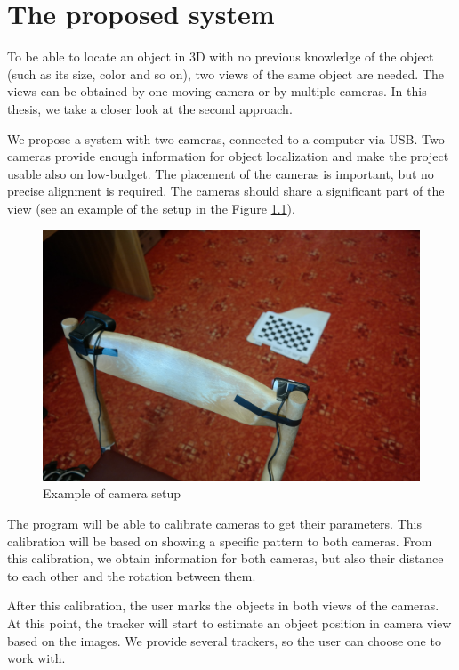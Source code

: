 \chapter{The proposed system}

To be able to locate an object in 3D with no previous knowledge of the object (such
as its size, color and so on), two views of the same object are needed. The
views can be obtained by one moving camera or by multiple cameras. In this
thesis, we take a closer look at the second approach.

We propose a system with two cameras, connected to a computer via USB.
Two cameras provide enough information for object localization and make the
project usable also on low-budget. The placement of the cameras is important,
but no precise alignment is required. The cameras should share a significant part
of the view (see an example of the setup in the Figure \ref{fig:camera-setup}).

\begin{figure}
	\includegraphics[width=\linewidth]{img/camera-positions.jpg}
	\caption{Example of camera setup}
	\label{fig:camera-setup}
\end{figure}

The program will be able to calibrate cameras to get their parameters. This
calibration will be based on showing a specific pattern to both cameras. From
this calibration, we obtain information for both cameras, but also their
distance to each other and the rotation between them.

After this calibration, the user marks the objects in both views of the
cameras. At this point, the tracker will start to estimate an object position
in camera view based on the images. We provide several trackers, so the user
can choose one to work with.

